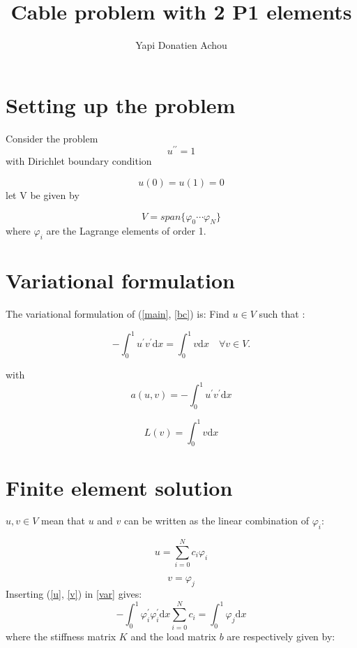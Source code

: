 \documentclass[10pt,a4paper]{report}
\begin{document}
\author{Yapi Donatien Achou}
\title{Cable problem with 2 P1 elements}
\maketitle
\section{Setting up the problem}
Consider the problem
\begin{equation}\label{main}
u^{\prime\prime} = 1 
\end{equation}
with Dirichlet boundary condition

\begin{equation} \label{bc}
u(0) = u(1)= 0
\end{equation}
let V be given by 

\begin{equation}
V = span\{\varphi_{0}\cdots\varphi_{N}\} \nonumber
\end{equation}
where $\varphi_{i}$ are the Lagrange elements of order 1.
\section{Variational formulation}
The variational formulation of (\ref{main}, \ref{bc}) is: Find $u\in V$ such that :

\begin{equation}\label{var}
-\int_{0}^{1} u^{\prime}v^{\prime} \mathrm{d}x = \int_{0}^{1} v \mathrm{d}x \quad \forall v\in V.
\end{equation}

with 
\begin{equation}
a(u,v) = -\int_{0}^{1} u^{\prime}v^{\prime} \mathrm{d}x\nonumber
\end{equation}

\begin{equation}
L(v) = \int_{0}^{1} v \mathrm{d}x\nonumber
\end{equation}
\section{Finite element solution}
$u,v \in V$ mean that $u$ and $v$ can be written as the linear combination of $\varphi_{i}$:

\begin{equation}\label{u}
u = \sum_{i = 0}^{N}c_{i}{\varphi_{i}}
\end{equation}

\begin{equation}\label{v}
v = \varphi_{j}
\end{equation}
Inserting (\ref{u}, \ref{v}) in \ref{var} gives:
\begin{equation}
-\int_{0}^{1} \varphi_{i}^{\prime}\varphi_{i}^{\prime} \mathrm{d}x\sum_{i = 0}^{N}c_{i} = \int_{0}^{1}\varphi_{j} \mathrm{d}x 
\end{equation}
where the stiffness matrix $K$ and the load matrix $b$ are respectively given by:
\end{document}
